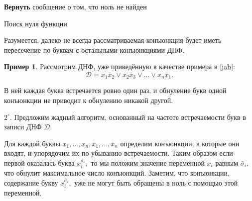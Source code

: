 \documentclass[12pt,a4paper,oneside,fleqn,leqno]{article}
\theoremstyle{definition}
\newtheorem{example}{Пример}%
\begin{document}
		\begin{algorithm}[H]
				\SetAlgoLined
				\textbf{Вернуть} сообщение о том, что ноль не найден\;
			\caption{Поиск нуля функции}
			\label{all_conj}
		\end{algorithm}\par
		Разумеется, далеко не всегда рассматриваемая конъюнкция будет иметь пересечение по буквам с остальными конъюнкциями ДНФ.\par
		\begin{example}
				Рассмотрим ДНФ, уже приведённую в качестве примера в \ref{jab}:
				$$
					\mathcal{D} = x_1\bar{x}_2 \vee x_2\bar{x}_3 \vee \ldots \vee x_n \bar{x}_1.
				$$\par
				В ней каждая буква встречается ровно один раз, и обнуление букв одной конъюнкции не приводит к обнулению никакой другой.
		\end{example}\par
		$2^{\circ}.$ Предложим жадный алгоритм, основанный на частоте встречаемости букв в записи ДНФ $\mathcal{D}.$\par
		Для каждой буквы $x_1,\ldots, x_n,\bar{x}_1,\ldots,\bar{x}_n$ определим конъюнкции, в которые они входят, и упорядочим их по убыванию встречаемости. Таким образом если первой оказалась буква $x_i^{\sigma_i},$ то мы положим значение переменной $x_i$ равным $\bar{\sigma}_i,$ что обнулит максимальное число конъюнкций. Заметим, что конъюнкции, содержание букву $x_i^{\bar{\sigma}_i},$ уже не могут быть обращены в ноль с помощью этой переменной.\par
\end{document}

